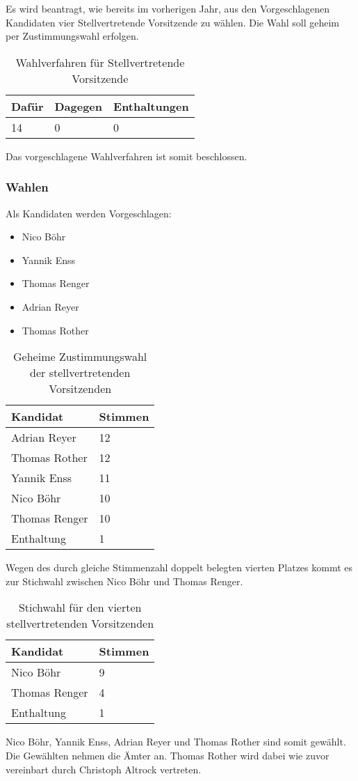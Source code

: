 \documentclass[a4paper]{scrartcl}
\begin{document}
Es wird beantragt, wie bereits im vorherigen Jahr, aus den Vorgeschlagenen Kandidaten vier Stellvertretende Vorsitzende zu wählen. Die Wahl soll geheim per Zustimmungswahl erfolgen.
\begin{table}[H]
\begin{tabularx}{\textwidth}{XXX}
Dafür & Dagegen & Enthaltungen\\
\toprule
14 & 0 & 0 \\
\end{tabularx}
\caption{Wahlverfahren für Stellvertretende Vorsitzende}
\end{table}
Das vorgeschlagene Wahlverfahren ist somit beschlossen.

\subsubsection{Wahlen}

Als Kandidaten werden Vorgeschlagen:
\begin{itemize}
\item Nico Böhr
\item Yannik Enss
\item Thomas Renger
\item Adrian Reyer
\item Thomas Rother
\end{itemize}

\begin{table}[H]
\begin{tabularx}{\textwidth}{XX}
Kandidat & Stimmen \\
\toprule
Adrian Reyer & 12 \\
Thomas Rother &  12 \\
Yannik Enss & 11 \\
Nico Böhr & 10 \\
Thomas Renger & 10 \\
Enthaltung & 1 \\
\end{tabularx}
\caption{Geheime Zustimmungswahl der stellvertretenden Vorsitzenden}
\end{table}
Wegen des durch gleiche Stimmenzahl doppelt belegten vierten Platzes kommt es zur Stichwahl zwischen Nico Böhr und Thomas Renger.
\begin{table}[H]
\begin{tabularx}{\textwidth}{XX}
Kandidat & Stimmen \\
\toprule
Nico Böhr & 9 \\
Thomas Renger & 4 \\
Enthaltung & 1 \\
\end{tabularx}
\caption{Stichwahl für den vierten stellvertretenden Vorsitzenden}
\end{table}
Nico Böhr, Yannik Enss, Adrian Reyer und Thomas Rother sind somit gewählt. Die Gewählten nehmen die Ämter an. Thomas Rother wird dabei wie zuvor vereinbart durch Christoph Altrock vertreten.
\end{document}
